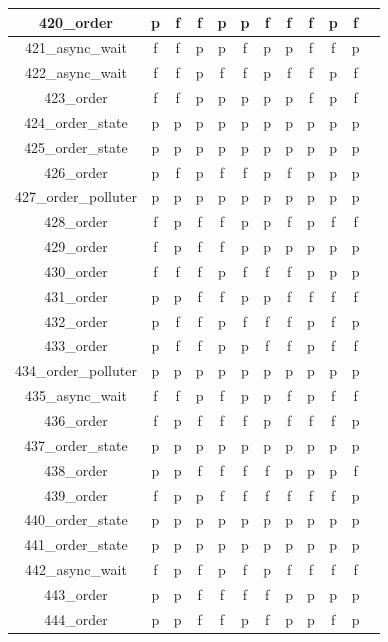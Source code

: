 \documentclass[
fancyheadings, %
%
%
]{stsreprt}
\begin{document}
\begin{longtable}{|c|c|c|c|c|c|c|c|c|c|c|c|}
\hline
420\_order & p & f & f & p & p & f & f & f & p & f \\
\hline
421\_async\_wait & f & f & p & p & f & p & p & f & f & p \\
\hline
422\_async\_wait & f & f & p & f & f & p & f & f & p & f \\
\hline
423\_order & f & f & p & p & p & p & p & f & p & f \\
\hline
424\_order\_state & p & p & p & p & p & p & p & p & p & p \\
\hline
425\_order\_state & p & p & p & p & p & p & p & p & p & p \\
\hline
426\_order & p & f & p & f & f & p & f & p & p & p \\
\hline
427\_order\_polluter & p & p & p & p & p & p & p & p & p & p \\
\hline
428\_order & f & p & f & f & p & p & f & p & f & f \\
\hline
429\_order & f & p & f & f & p & p & p & p & p & p \\
\hline
430\_order & f & f & f & p & f & f & f & p & p & p \\
\hline
431\_order & p & p & f & f & p & p & f & f & f & f \\
\hline
432\_order & p & f & f & p & f & f & f & p & f & p \\
\hline
433\_order & p & f & f & p & p & f & f & p & f & f \\
\hline
434\_order\_polluter & p & p & p & p & p & p & p & p & p & p \\
\hline
435\_async\_wait & f & f & p & f & p & p & f & p & f & f \\
\hline
436\_order & f & p & f & f & f & p & f & f & f & p \\
\hline
437\_order\_state & p & p & p & p & p & p & p & p & p & p \\
\hline
438\_order & p & p & f & f & f & f & p & p & p & f \\
\hline
439\_order & f & p & p & f & f & f & f & f & f & p \\
\hline
440\_order\_state & p & p & p & p & p & p & p & p & p & p \\
\hline
441\_order\_state & p & p & p & p & p & p & p & p & p & p \\
\hline
442\_async\_wait & f & p & f & p & f & p & f & f & f & f \\
\hline
443\_order & p & p & f & f & f & f & p & p & p & p \\
\hline
444\_order & p & p & f & f & p & f & p & p & f & p \\

\end{longtable}
\end{document}
